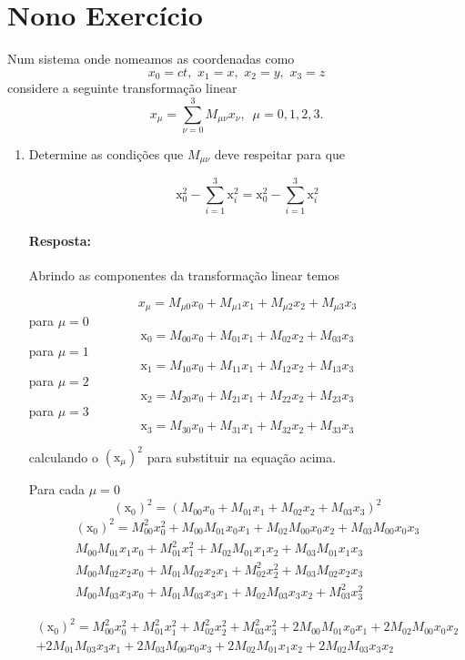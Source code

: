 \documentclass[10pt,a4paper]{article}
\begin{document}
	\section{Nono Exercício}
	Num sistema onde nomeamos as coordenadas como
	$$x_0 = ct,\,\,x_1 =x,\,\,x_2=y,\,\,x_3=z$$
	considere a seguinte transformação linear
	$$x_\mu = \sum_{\nu=0}^{3} M_{\mu\nu} x_\nu,\,\,\,\mu =0,1,2,3.$$
	\begin{enumerate}
		\item Determine as condições que $ M_{\mu\nu} $ deve respeitar para que
		
		$$ \text{\~{x}}^2_0 - \sum_{i=1}^{3} \text{\~{x}}^2_i = \text{x}^2_0 - \sum_{i=1}^{3} \text{x}^2_i $$
	
	\paragraph{Resposta:}
	Abrindo as componentes da transformação linear temos
	
	$$ x_\mu = M_{\mu0} x_0 + M_{\mu1} x_1+M_{\mu2} x_2+M_{\mu3} x_3 $$
	para $ \mu =0 $
	$$ \text{\~{x}}_0 = M_{00} x_0 + M_{01} x_1+M_{02} x_2+M_{03} x_3 $$
	para $ \mu =1 $
	$$ \text{\~{x}}_1 = M_{10} x_0 + M_{11} x_1+M_{12} x_2+M_{13} x_3 $$
	para $ \mu =2 $
	$$\text{\~{x}}_2 = M_{20} x_0 + M_{21} x_1+M_{22} x_2+M_{23} x_3 $$
	para $ \mu =3 $
	$$ \text{\~{x}}_3 = M_{30} x_0 + M_{31} x_1+M_{32} x_2+M_{33} x_3 $$
	 
	 calculando o $( \text{\~{x}}_\mu)^2 $ para substituir na equação acima.
	 
	 Para cada $ \mu=0 $
	 $$ (\text{\~{x}}_0)^2 =  (M_{00} x_0 + M_{01} x_1+M_{02} x_2+M_{03} x_3)^2 $$
	 \begin{equation}\nonumber
	 	\begin{split}
	 		(\text{\~{x}}_0)^2 =  M_{00}^2 x_0^2 + M_{00}M_{01} x_0x_1+M_{02}M_{00} x_0 x_2+M_{03}M_{00} x_0 x_3\\ 
	 		M_{00}M_{01} x_1 x_0 + M_{01}^2 x_1^2+M_{02}M_{01} x_1 x_2+M_{03}M_{01} x_1 x_3\\
	 		M_{00}M_{02} x_2 x_0 + M_{01}M_{02} x_2 x_1+M_{02}^2x_2^2+M_{03} M_{02} x_2x_3\\
	 		M_{00}M_{03} x_3 x_0 + M_{01}M_{03} x_3 x_1+M_{02}M_{03} x_3 x_2+M_{03}^2 x_3^2
	 	\end{split}
	 \end{equation}
 
	 \begin{equation}\nonumber
	 	\begin{split}
	 		(\text{\~{x}}_0)^2 =  M_{00}^2 x_0^2 +M_{01}^2 x_1^2+M_{02}^2x_2^2+M_{03}^2 x_3^2+ 2M_{00}M_{01} x_0x_1+2M_{02}M_{00} x_0 x_2\\+2M_{01}M_{03} x_3 x_1+2M_{03}M_{00} x_0 x_3+2M_{02}M_{01} x_1 x_2+2M_{02}M_{03} x_3 x_2
	 	\end{split}
	 \end{equation}
 

\end{enumerate}
\end{document}
